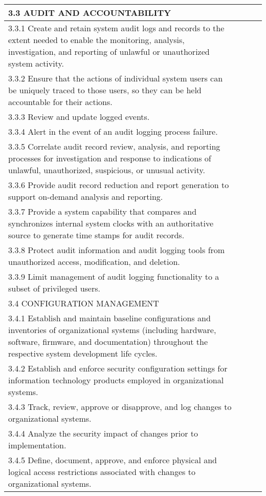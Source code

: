 \begin{longtable} {|p{}|p{}|p{}|p{} |}
{3.3 AUDIT AND ACCOUNTABILITY}&&& \\ \hline
{3.3.1 Create and retain system audit logs and records to the extent needed to enable the monitoring, analysis, investigation, and reporting of unlawful or unauthorized system activity.}&&& \\ \hline
{3.3.2 Ensure that the actions of individual system users can be uniquely traced to those users, so they can be held accountable for their actions.}&&& \\ \hline
{3.3.3 Review and update logged events.}&&& \\ \hline
{3.3.4 Alert in the event of an audit logging process failure.}&&& \\ \hline
{3.3.5 Correlate audit record review, analysis, and reporting processes for investigation and response to indications of unlawful, unauthorized, suspicious, or unusual activity.}&&& \\ \hline
{3.3.6 Provide audit record reduction and report generation to support on-demand analysis and reporting.}&&& \\ \hline
{3.3.7 Provide a system capability that compares and synchronizes internal system clocks with an authoritative source to generate time stamps for audit records.}&&& \\ \hline
{3.3.8 Protect audit information and audit logging tools from unauthorized access, modification, and deletion.}&&& \\ \hline
{3.3.9 Limit management of audit logging functionality to a subset of privileged users.}&&& \\ \hline
{3.4 CONFIGURATION MANAGEMENT}&&& \\ \hline
{3.4.1 Establish and maintain baseline configurations and inventories of organizational systems (including hardware, software, firmware, and documentation) throughout the respective system development life cycles.}&&& \\ \hline
{3.4.2 Establish and enforce security configuration settings for information technology products employed in organizational systems.}&&& \\ \hline
{3.4.3 Track, review, approve or disapprove, and log changes to organizational systems.}&&& \\ \hline
{3.4.4 Analyze the security impact of changes prior to implementation.}&&& \\ \hline
{3.4.5 Define, document, approve, and enforce physical and logical access restrictions associated with changes to organizational systems.}&&& \\ \hline

\end{longtable}
